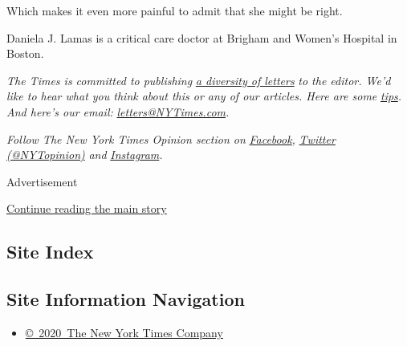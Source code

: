 Which makes it even more painful to admit that she might be right.

Daniela J. Lamas is a critical care doctor at Brigham and Women's
Hospital in Boston.

\emph{The Times is committed to publishing}
\href{https://www.nytimes3xbfgragh.onion/2019/01/31/opinion/letters/letters-to-editor-new-york-times-women.html}{\emph{a
diversity of letters}} \emph{to the editor. We'd like to hear what you
think about this or any of our articles. Here are some}
\href{https://help.nytimes3xbfgragh.onion/hc/en-us/articles/115014925288-How-to-submit-a-letter-to-the-editor}{\emph{tips}}\emph{.
And here's our email:}
\href{mailto:letters@NYTimes.com}{\emph{letters@NYTimes.com}}\emph{.}

\emph{Follow The New York Times Opinion section on}
\href{https://www.facebookcorewwwi.onion/nytopinion}{\emph{Facebook}}\emph{,}
\href{http://twitter.com/NYTOpinion}{\emph{Twitter (@NYTopinion)}}
\emph{and}
\href{https://www.instagram.com/nytopinion/}{\emph{Instagram}}\emph{.}

Advertisement

\protect\hyperlink{after-bottom}{Continue reading the main story}

\hypertarget{site-index}{%
\subsection{Site Index}\label{site-index}}

\hypertarget{site-information-navigation}{%
\subsection{Site Information
Navigation}\label{site-information-navigation}}

\begin{itemize}
\tightlist
\item
  \href{https://help.nytimes3xbfgragh.onion/hc/en-us/articles/115014792127-Copyright-notice}{©~2020~The
  New York Times Company}
\end{itemize}

